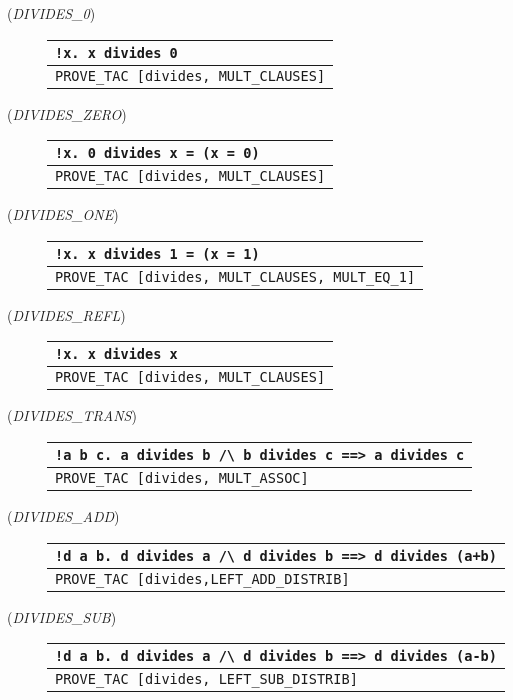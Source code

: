 \begin{description}
\label{euclid:extra-proofs}
\item [\small{({\it DIVIDES\_0\/})}]
\begin{tabular}[t]{l}
\verb+!x. x divides 0+ \\ \hline
 \verb+PROVE_TAC [divides, MULT_CLAUSES]+
\end{tabular}

\item[\small{({\it DIVIDES\_ZERO\/})}]
\begin{tabular}[t]{l}
\verb+!x. 0 divides x = (x = 0)+ \\ \hline
 \verb+PROVE_TAC [divides, MULT_CLAUSES]+
\end{tabular}

\item[\small{({\it DIVIDES\_ONE\/})}]
\begin{tabular}[t]{l}
\verb+!x. x divides 1 = (x = 1)+ \\ \hline
 \verb+PROVE_TAC [divides, MULT_CLAUSES, MULT_EQ_1]+
\end{tabular}

\item[\small{({\it DIVIDES\_REFL\/})}]
\begin{tabular}[t]{l}
\verb+!x. x divides x+ \\ \hline
 \verb+PROVE_TAC [divides, MULT_CLAUSES]+ \\
\end{tabular}

\item[\small{({\it DIVIDES\_TRANS\/})}]
\begin{tabular}[t]{l}
\verb+!a b c. a divides b /\ b divides c ==> a divides c+ \\ \hline
 \verb+PROVE_TAC [divides, MULT_ASSOC]+ \\
\end{tabular}
\item[\small{({\it DIVIDES\_ADD\/})}]
\begin{tabular}[t]{l}
\verb|!d a b. d divides a /\ d divides b ==> d divides (a+b)| \\ \hline
 \verb|PROVE_TAC [divides,LEFT_ADD_DISTRIB]|
\end{tabular}

\item[\small{({\it DIVIDES\_SUB\/})}]
\begin{tabular}[t]{l}
\verb+!d a b. d divides a /\ d divides b ==> d divides (a-b)+ \\ \hline
 \verb+PROVE_TAC [divides, LEFT_SUB_DISTRIB]+ \\
\end{tabular}


\end{description}
